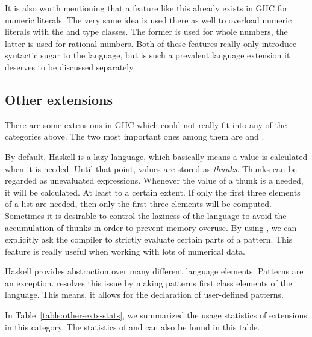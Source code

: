 \documentclass[main.tex]{subfiles}
\begin{document}
	It is also worth mentioning that a feature like this already exists in GHC for numeric literals. The very same idea is used there as well to overload numeric literals with the  and  type classes. The former is used for whole numbers, the latter is used for rational numbers. Both of these features really only introduce syntactic sugar to the language, but  is such a prevalent language extension it deserves to be discussed separately.  
	
	
	\subsection{Other extensions}
	
	There are some extensions in GHC which could not really fit into any of the categories above. The two most important ones among them are  and .
	
	By default, Haskell is a lazy language, which basically means a value is calculated when it is needed. Until that point, values are stored as \emph{thunks}. Thunks can be regarded as unevaluated expressions. Whenever the value of a thunk is a needed, it will be calculated. At least to a certain extent. If only the first three elements of a list are needed, then only the first three elements will be computed. Sometimes it is desirable to control the laziness of the language to avoid the accumulation of thunks in order to prevent memory overuse. By using , we can explicitly ask the compiler to strictly evaluate certain parts of a pattern. This feature is really useful when working with lots of numerical data.
	
	Haskell provides abstraction over many different language elements. Patterns are an exception.  resolves this issue by making patterns first class elements of the language. This means, it allows for the declaration of user-defined patterns.
	
	In Table~\ref{table:other-exts-stats}, we summarized the usage statistics of extensions in this category. The statistics of  and  can also be found in this table.
	
\end{document}
